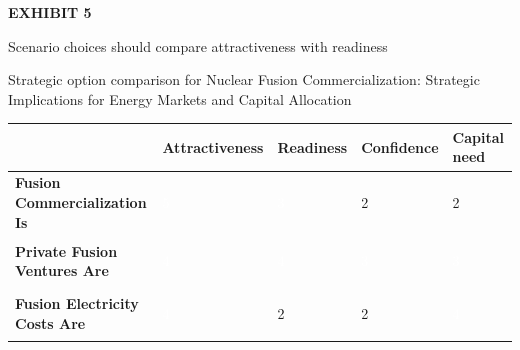 \documentclass[10pt,a4paper]{article}
\begin{document}
\clearpage
{\textcolor{BOGreen}{\scriptsize\bfseries EXHIBIT 5}}\par\vspace{4pt}
{\sffamily\fontsize{17}{21}\selectfont\color{BONavy} Scenario choices should compare attractiveness with readiness}\par
{\small\color{BOText} Strategic option comparison for Nuclear Fusion Commercialization: Strategic Implications for Energy Markets and Capital Allocation}\par\vspace{6pt}
{\scriptsize\begin{tabular}{p{38mm}>{\centering\arraybackslash}p{21mm}>{\centering\arraybackslash}p{21mm}>{\centering\arraybackslash}p{21mm}>{\centering\arraybackslash}p{21mm}}
 & {\bfseries Attractiveness} & {\bfseries Readiness} & {\bfseries Confidence} & {\bfseries Capital need} \\
\hline
{\bfseries Fusion Commercialization Is} & \colorbox{BOGreen}{\textcolor{white}{\strut\hspace{5pt}5\hspace{5pt}}} & \colorbox{BOBlue}{\textcolor{white}{\strut\hspace{5pt}3\hspace{5pt}}} & \colorbox{BOLight}{\textcolor{BOText}{\strut\hspace{5pt}2\hspace{5pt}}} & \colorbox{BOLight}{\textcolor{BOText}{\strut\hspace{5pt}2\hspace{5pt}}} \\
{\bfseries Private Fusion Ventures Are} & \colorbox{BOGreen}{\textcolor{white}{\strut\hspace{5pt}4\hspace{5pt}}} & \colorbox{BOGreen}{\textcolor{white}{\strut\hspace{5pt}4\hspace{5pt}}} & \colorbox{BOBlue}{\textcolor{white}{\strut\hspace{5pt}3\hspace{5pt}}} & \colorbox{BOBlue}{\textcolor{white}{\strut\hspace{5pt}3\hspace{5pt}}} \\
{\bfseries Fusion Electricity Costs Are} & \colorbox{BOGreen}{\textcolor{white}{\strut\hspace{5pt}4\hspace{5pt}}} & \colorbox{BOLight}{\textcolor{BOText}{\strut\hspace{5pt}2\hspace{5pt}}} & \colorbox{BOLight}{\textcolor{BOText}{\strut\hspace{5pt}2\hspace{5pt}}} & \colorbox{BOGreen}{\textcolor{white}{\strut\hspace{5pt}4\hspace{5pt}}} \\

\end{tabular}}
\end{document}
